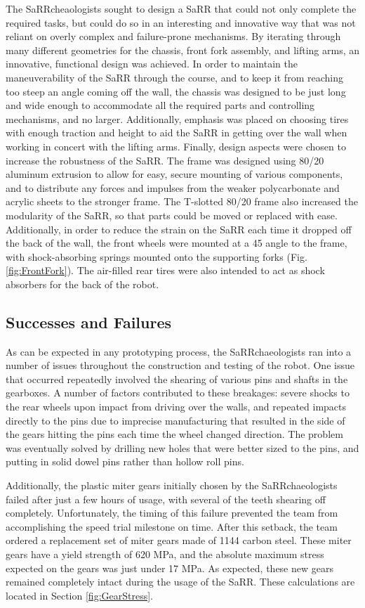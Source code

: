 The SaRRcheaologists sought to design a SaRR that could not only complete the required tasks, but could do so in an interesting and innovative way that was not reliant on overly complex and failure-prone mechanisms. By iterating through many different geometries for the chassis, front fork assembly, and lifting arms, an innovative, functional design was achieved. In order to maintain the maneuverability of the SaRR through the course, and to keep it from reaching too steep an angle coming off the wall, the chassis was designed to be just long and wide enough to accommodate all the required parts and controlling mechanisms, and no larger. Additionally, emphasis was placed on choosing tires with enough traction and height to aid the SaRR in getting over the wall when working in concert with the lifting arms. Finally, design aspects were chosen to increase the robustness of the SaRR. The frame was designed using 80/20 aluminum extrusion to allow for easy, secure mounting of various components, and to distribute any forces and impulses from the weaker polycarbonate and acrylic sheets to the stronger frame.
The T-slotted 80/20 frame also increased the modularity of the SaRR, so that parts could be moved or replaced with ease. Additionally, in order to reduce the strain on the SaRR each time it dropped off the back of the wall, the front wheels were mounted at a 45 \degree angle to the frame, with shock-absorbing springs mounted onto the supporting forks (Fig. \ref{fig:FrontFork}). The air-filled rear tires were also intended to act as shock absorbers for the back of the robot.

\subsection{Successes and Failures}
As can be expected in any prototyping process, the SaRRchaeologists ran into a number of issues throughout the construction and testing of the robot. One issue that occurred repeatedly involved the shearing of various pins and shafts in the gearboxes. A number of factors contributed to these breakages: severe shocks to the rear wheels upon impact from driving over the walls, and repeated impacts directly to the pins due to imprecise manufacturing that resulted in the side of the gears hitting the pins each time the wheel changed direction. The problem was eventually solved by drilling new holes that were better sized to the pins, and putting in solid dowel pins rather than hollow roll pins.


Additionally, the plastic miter gears initially chosen by the SaRRchaeologists failed after just a few hours of usage, with several of the teeth shearing off completely. Unfortunately, the timing of this failure prevented the team from accomplishing the speed trial milestone on time. After this setback, the team ordered a replacement set of miter gears made of 1144 carbon steel. These miter gears have a yield strength of 620 MPa, and the absolute maximum stress expected on the gears was just under 17 MPa. As expected, these new gears remained completely intact during the usage of the SaRR. These calculations are located in Section \ref{fig:GearStress}.

